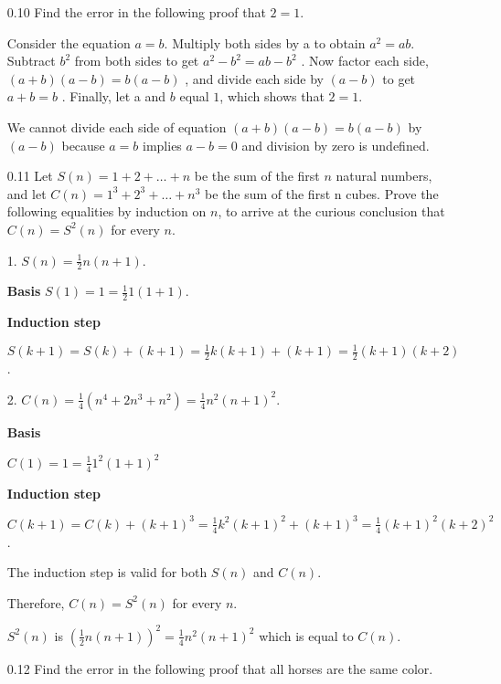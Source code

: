 
\begin{enumerate}

    \item[0.10]
          Find the error in the following proof that $2 = 1$.

          Consider the equation $a = b$. Multiply both sides by a to obtain
          $a^2 = ab$.
          Subtract
          $b^2$
          from both sides to get
          $a^2 - b^2 = ab - b^2$
          . Now factor each side,
          $(a + b)(a - b) = b(a - b)$
          , and divide each side by
          $(a - b)$
          to get
          $a + b = b$
          . Finally, let a and $b$ equal $1$, which shows that $2 = 1$.


          We cannot divide each side of equation $(a + b)(a - b) = b(a - b)$ by $(a - b)$ because $a = b$ implies $a - b = 0$ and division by zero is undefined.

    \item[0.11]
          Let $S(n) = 1 + 2 + \ldots + n$ be the sum of the first $n$ natural numbers, and let $C(n) = 1^3 + 2^3 + \ldots + n^3$ be the sum of the first n cubes. Prove the following equalities by induction on $n$, to arrive at the curious conclusion that $C(n) = S^2(n)$ for every $n$.

          1. $S(n) = \frac{1}{2} n(n+1)$.

          \textbf{Basis}
          $ S(1) = 1 = \frac{1}{2} 1(1+1)$.

          \textbf{Induction step}

          $ S(k+1) = S(k) + (k+1) = \frac{1}{2} k(k+1) + (k+1) = \frac{1}{2} (k+1)(k+2)$.

          2. $C(n) = \frac{1}{4}(n^4 + 2n^3 + n^2) = \frac{1}{4} n^2(n+1)^2$.

          \textbf{Basis}

          $ C(1) = 1 = \frac{1}{4} 1^2(1+1)^2$

          \textbf{Induction step}

          $ C(k+1) = C(k) + (k+1)^3 = \frac{1}{4} k^2(k+1)^2 + (k+1)^3 = \frac{1}{4} (k+1)^2(k+2)^2$.

          The induction step is valid for both $S(n)$ and $C(n)$.

          Therefore, $C(n) = S^2(n)$ for every $n$.

          $S^2(n)$ is $(\frac{1}{2} n(n+1))^2 = \frac{1}{4} n^2(n+1)^2$ which is equal to $C(n)$.

    \item[0.12]
          Find the error in the following proof that all horses are the same color.


\end{enumerate}
